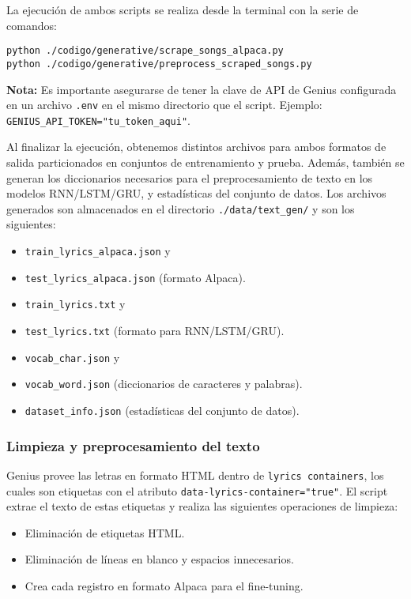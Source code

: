 \documentclass[paper=letter, fontsize=11pt, draft=false]{scrartcl}
\numberwithin{equation}{section} %
\numberwithin{figure}{section} %
\numberwithin{table}{section} %
\numberwithin{subsection}{section}
\begin{document}
La ejecución de ambos scripts se realiza desde la terminal con la serie de comandos:

\begin{center}
\texttt{python ./codigo/generative/scrape\_songs\_alpaca.py} \\
\texttt{python ./codigo/generative/preprocess\_scraped\_songs.py}
\end{center}

\textbf{Nota:} Es importante asegurarse de tener la clave de API de Genius configurada en un archivo \texttt{.env} en el mismo directorio que el script. Ejemplo: \texttt{GENIUS\_API\_TOKEN="tu\_token\_aqui"}.

Al finalizar la ejecución, obtenemos distintos archivos para ambos formatos de salida particionados en conjuntos de entrenamiento y prueba. Además, también se generan los diccionarios necesarios para el preprocesamiento de texto en los modelos RNN/LSTM/GRU, y estadísticas del conjunto de datos. Los archivos generados son almacenados en el directorio \texttt{./data/text\_gen/} y son los siguientes:
\begin{itemize}
    \item \texttt{train\_lyrics\_alpaca.json} y
    \item  \texttt{test\_lyrics\_alpaca.json} (formato Alpaca).
    \item \texttt{train\_lyrics.txt} y
    \item \texttt{test\_lyrics.txt} (formato para RNN/LSTM/GRU).
    \item \texttt{vocab\_char.json} y
    \item \texttt{vocab\_word.json} (diccionarios de caracteres y palabras).
    \item \texttt{dataset\_info.json} (estadísticas del conjunto de datos).
\end{itemize}



\subsubsection{Limpieza y preprocesamiento del texto}

Genius provee las letras en formato HTML dentro de \texttt{lyrics containers}, los cuales son etiquetas con el atributo \texttt{data-lyrics-container="true"}. El script extrae el texto de estas etiquetas y realiza las siguientes operaciones de limpieza:

\begin{itemize}
    \item Eliminación de etiquetas HTML.
    \item Eliminación de líneas en blanco y espacios innecesarios.
    \item Crea cada registro en formato Alpaca para el fine-tuning.
\end{itemize}
\end{document}
